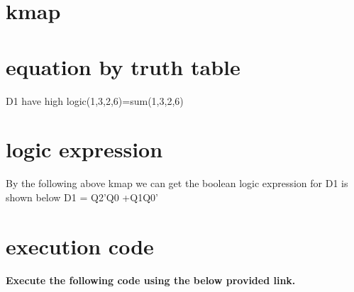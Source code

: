 \documentclass[a4paper,10pt,twocolumn]{article}
\begin{document}
\section{kmap}
\begin{table}[ht]
\caption{kmap}
\end{table}

\section{equation by truth table}
     
D1 have high logic(1,3,2,6)=sum(1,3,2,6)


\section{logic expression} 
By the following above kmap we can get the boolean logic expression for D1 is shown below
     D1 = Q2'Q0 +Q1Q0'
     
\section{execution code}
\textbf{Execute the following code using the below provided link.}\\
\begin{center}
\end{center}
\end{document}
